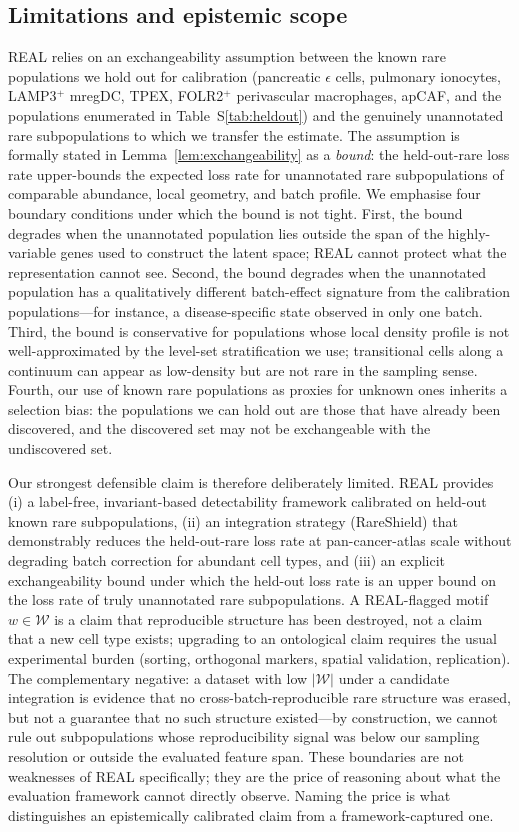 \subsection*{Limitations and epistemic scope}
\label{philo:limitations}
REAL relies on an exchangeability assumption between the known rare populations we hold out for calibration (pancreatic $\epsilon$ cells, pulmonary ionocytes, LAMP3$^+$ mregDC, TPEX, FOLR2$^+$ perivascular macrophages, apCAF, and the populations enumerated in Table~S\ref{tab:heldout}) and the genuinely unannotated rare subpopulations to which we transfer the estimate. The assumption is formally stated in Lemma~\ref{lem:exchangeability} as a \emph{bound}: the held-out-rare loss rate upper-bounds the expected loss rate for unannotated rare subpopulations of comparable abundance, local geometry, and batch profile. We emphasise four boundary conditions under which the bound is not tight. First, the bound degrades when the unannotated population lies outside the span of the highly-variable genes used to construct the latent space; REAL cannot protect what the representation cannot see. Second, the bound degrades when the unannotated population has a qualitatively different batch-effect signature from the calibration populations---for instance, a disease-specific state observed in only one batch. Third, the bound is conservative for populations whose local density profile is not well-approximated by the level-set stratification we use; transitional cells along a continuum can appear as low-density but are not rare in the sampling sense. Fourth, our use of known rare populations as proxies for unknown ones inherits a selection bias: the populations we can hold out are those that have already been discovered, and the discovered set may not be exchangeable with the undiscovered set.

Our strongest defensible claim is therefore deliberately limited. REAL provides (i) a label-free, invariant-based detectability framework calibrated on held-out known rare subpopulations, (ii) an integration strategy (RareShield) that demonstrably reduces the held-out-rare loss rate at pan-cancer-atlas scale without degrading batch correction for abundant cell types, and (iii) an explicit exchangeability bound under which the held-out loss rate is an upper bound on the loss rate of truly unannotated rare subpopulations. A REAL-flagged motif $w \in \mathcal{W}$ is a claim that reproducible structure has been destroyed, not a claim that a new cell type exists; upgrading to an ontological claim requires the usual experimental burden (sorting, orthogonal markers, spatial validation, replication). The complementary negative: a dataset with low $|\mathcal{W}|$ under a candidate integration is evidence that no cross-batch-reproducible rare structure was erased, but not a guarantee that no such structure existed---by construction, we cannot rule out subpopulations whose reproducibility signal was below our sampling resolution or outside the evaluated feature span. These boundaries are not weaknesses of REAL specifically; they are the price of reasoning about what the evaluation framework cannot directly observe. Naming the price is what distinguishes an epistemically calibrated claim from a framework-captured one.

